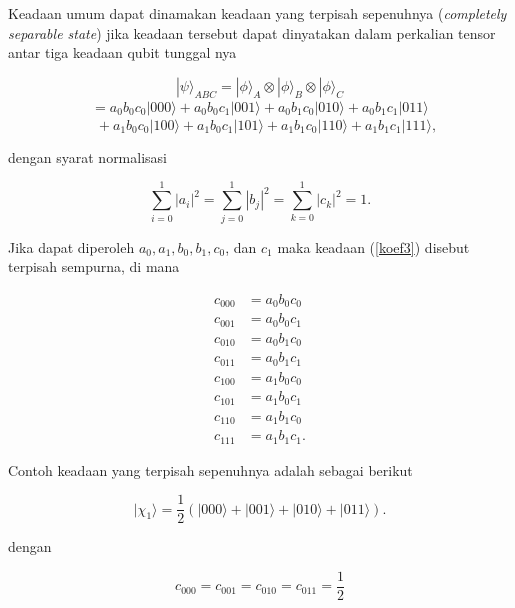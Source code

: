\par
Keadaan umum dapat dinamakan keadaan yang terpisah sepenuhnya
(\textit{completely separable state}) jika keadaan tersebut dapat dinyatakan dalam
perkalian tensor antar tiga keadaan qubit tunggal nya

\begin{equation}
|\psi\rangle_{ABC}
=
|\phi\rangle_A \otimes |\phi\rangle_B \otimes |\phi\rangle_C
\end{equation}
\begin{align*}
=
a_0 b_0 c_0 |000\rangle
+ a_0 b_0 c_1 |001\rangle
+ a_0 b_1 c_0 |010\rangle
+ a_0 b_1 c_1 |011\rangle
\end{align*}
\begin{equation}\label{koef3}
\quad
+ a_1 b_0 c_0 |100\rangle
+ a_1 b_0 c_1 |101\rangle
+ a_1 b_1 c_0 |110\rangle
+ a_1 b_1 c_1 |111\rangle ,
\end{equation}

dengan syarat normalisasi

\begin{equation}
\sum_{i=0}^{1} |a_i|^2
=
\sum_{j=0}^{1} |b_j|^2
=
\sum_{k=0}^{1} |c_k|^2
= 1 .
\end{equation}

Jika dapat diperoleh $a_0, a_1, b_0, b_1, c_0$, dan $c_1$ maka keadaan (\ref{koef3}) disebut terpisah sempurna, di mana

\begin{align}
c_{000} &= a_0 b_0 c_0 \nonumber \\
c_{001} &= a_0 b_0 c_1 \nonumber \\
c_{010} &= a_0 b_1 c_0 \nonumber \\
c_{011} &= a_0 b_1 c_1 \nonumber \\
c_{100} &= a_1 b_0 c_0 \nonumber \\
c_{101} &= a_1 b_0 c_1 \nonumber \\
c_{110} &= a_1 b_1 c_0 \nonumber \\
c_{111} &= a_1 b_1 c_1 \label{koefisien3qubit}.
\end{align}

Contoh keadaan yang terpisah sepenuhnya adalah sebagai berikut

\begin{equation}
|\chi_1\rangle =
\frac{1}{2}
\left(
|000\rangle + |001\rangle + |010\rangle + |011\rangle
\right) .
\end{equation}

dengan

\begin{equation}
	c_{000}=c_{001}=c_{010}=c_{011}=\frac{1}{2}
\end{equation}

